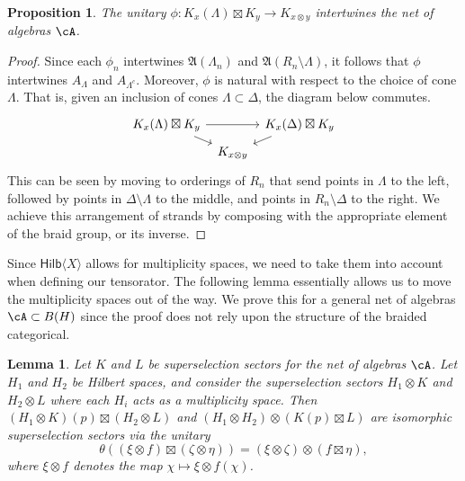\documentclass[11pt,reqno]{amsart}
\numberwithin{equation}{section}
\theoremstyle{plain}
\newtheorem{lemma}[equation]{Lemma}
\newtheorem{proposition}[equation]{Proposition}
\theoremstyle{definition}
\begin{document}
\begin{proposition}
    The unitary $\phi:K_x({\Lambda})\boxtimes K_y\to K_{x\otimes y}$ intertwines the net of algebras $\cA$.
\end{proposition}
\begin{proof}
    Since each $\phi_n$ intertwines $\mathfrak{A}(\Lambda_n)$ and $\mathfrak{A}(R_n\setminus\Lambda)$, it follows that $\phi$ intertwines $A_\Lambda$ and $A_{\Lambda^c}$. Moreover, $\phi$ is natural with respect to the choice of cone $\Lambda$. That is, given an inclusion of cones $\Lambda\subset\Delta$, the diagram below commutes.
    \[\begin{tikzcd}[column sep=.5em, row sep=.5em]
	{K_x({\Lambda})\boxtimes K_y} && {K_x({\Delta})\boxtimes K_y} \\
	& {K_{x\otimes y}}
	\arrow[from=1-1, to=1-3]
	\arrow[from=1-1, to=2-2]
	\arrow[from=1-3, to=2-2]
\end{tikzcd}\]
This can be seen by moving to orderings of $R_n$ that send points in $\Lambda$ to the left, followed by points in $\Delta\setminus\Lambda$ to the middle, and points in $R_n\setminus\Delta$ to the right. 
We achieve this arrangement of strands by composing with the appropriate element of the braid group, or its inverse.
\end{proof}

Since $\mathsf{Hilb}\langle X \rangle$ allows for multiplicity spaces, we need to take them into account when defining our tensorator. The following lemma essentially allows us to move the multiplicity spaces out of the way. We prove this for a general net of algebras $\cA \subset B(H)$ since the proof does not rely upon the structure of the braided categorical.
\begin{lemma}
    Let $K$ and $L$ be superselection sectors for the net of algebras $\cA$. 
    Let $H_1$ and $H_2$ be Hilbert spaces, and consider the superselection sectors $H_1 \otimes K$ and $H_2 \otimes L$ where each $H_i$ acts as a multiplicity space. 
    Then $(H_1 \otimes K)(p) \boxtimes (H_2 \otimes L)$ and $(H_1 \otimes H_2) \otimes (K(p)\boxtimes L)$ are isomorphic superselection sectors via the unitary $$\theta((\xi \otimes f) \boxtimes (\zeta \otimes \eta))=(\xi \otimes \zeta) \otimes (f \boxtimes \eta),$$
    where $\xi\otimes f$ denotes the map $\chi\mapsto \xi\otimes f(\chi)$.
\end{lemma}
\end{document}
